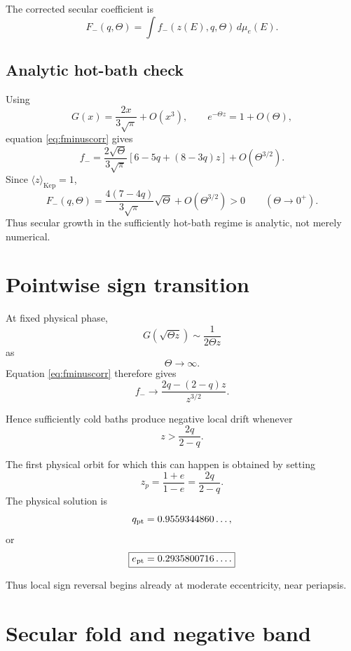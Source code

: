 \documentclass[11pt]{article}
\theoremstyle{remark}
\newcommand{\Kep}{\mathrm{Kep}}
\newcommand{\1}{\mathbf 1}
\begin{document}
The corrected secular coefficient is
\begin{equation}
\boxed{
F_-(q,\Theta)
=
\int f_-(z(E),q,\Theta)\,d\mu_e(E).
}
\label{eq:Fminus}
\end{equation}

\subsection{Analytic hot-bath check}

Using
\[
G(x)=\frac{2x}{3\sqrt\pi}+O(x^3),
\qquad
e^{-\Theta z}=1+O(\Theta),
\]
equation \eqref{eq:fminuscorr} gives
\[
f_-
=
\frac{2\sqrt\Theta}{3\sqrt\pi}
\left[
6-5q+(8-3q)z
\right]
+
O(\Theta^{3/2}).
\]
Since \(\langle z\rangle_{\Kep}=1\),
\begin{equation}
\boxed{
F_-(q,\Theta)
=
\frac{4(7-4q)}{3\sqrt\pi}\sqrt\Theta
+
O(\Theta^{3/2})
>0
}
\qquad
(\Theta\to0^+).
\label{eq:hotsecular}
\end{equation}
Thus secular growth in the sufficiently hot-bath regime is analytic, not
merely numerical.

\section{Pointwise sign transition}

At fixed physical phase,
\[
G(\sqrt{\Theta z})
\sim
\frac{1}{2\Theta z}
\]
as
\[
\Theta\to\infty.
\]
Equation \eqref{eq:fminuscorr} therefore gives
\begin{equation}
\boxed{
f_-
\longrightarrow
\frac{2q-(2-q)z}{z^{3/2}}.
}
\label{eq:pointwisecold}
\end{equation}

Hence sufficiently cold baths produce negative local drift whenever
\[
\boxed{
z>\frac{2q}{2-q}.
}
\]

The first physical orbit for which this can happen is obtained by setting
\[
z_p=\frac{1+e}{1-e}
=
\frac{2q}{2-q}.
\]
The physical solution is
\[
q_{\rm pt}
=
0.9559344860\ldots,
\]
or
\begin{equation}
\boxed{
e_{\rm pt}
=
0.2935800716\ldots.
}
\end{equation}

Thus local sign reversal begins already at moderate eccentricity, near
periapsis.

\section{Secular fold and negative band}
\end{document}
